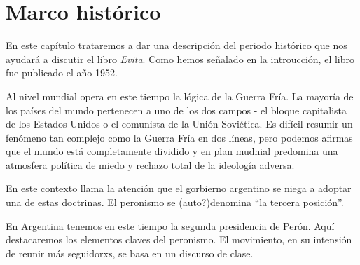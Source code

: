 \section{Marco histórico}

En este capítulo trataremos a dar una descripción del periodo histórico que nos ayudará a discutir el libro \textit{Evita}.
Como hemos señalado en la introucción, el libro fue publicado el año 1952.

Al nivel mundial opera en este tiempo la lógica de la Guerra Fría.
La mayoría de los países del mundo pertenecen a uno de los dos campos - el bloque capitalista de los Estados Unidos o el comunista de la Unión Soviética.
Es difícil resumir un fenómeno tan complejo como la Guerra Fría en dos líneas, pero podemos afirmas que el mundo está completamente dividido y en plan mudnial predomina una atmosfera política de miedo y rechazo total de la ideología adversa.

En este contexto llama la atención que el gorbierno argentino se niega a adoptar una de estas doctrinas.
El peronismo se (auto?)denomina ``la tercera posición''.

En Argentina tenemos en este tiempo la segunda presidencia de Perón.
Aquí destacaremos los elementos claves del peronismo.
El movimiento, en su intensión de reunir más seguidorxs, se basa en un discurso de clase.




